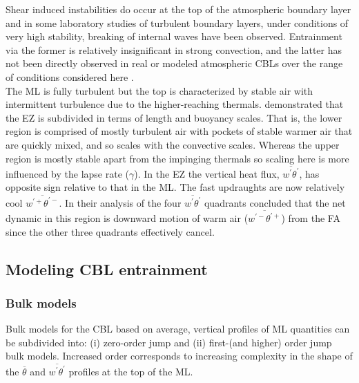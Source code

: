 Shear induced instabilities do occur at the top of the atmospheric boundary layer and in some laboratory studies of turbulent boundary layers, under conditions of very high stability, breaking of internal waves have been observed.  Entrainment via the former is relatively insignificant in strong convection, and the latter has not been directly observed in real or modeled atmospheric CBLs over the range of conditions considered here \citep{Traum11, SullMoengStev}.\\

The ML is fully turbulent but the top is characterized by stable air with intermittent turbulence due to the higher-reaching thermals. \cite{GarciaMellado} demonstrated that the EZ is subdivided in terms of length and buoyancy scales.  That is, the lower region is comprised of mostly turbulent air with pockets of stable warmer air that are quickly mixed, and so scales with the convective scales. Whereas the upper region is mostly stable apart from the impinging thermals so scaling here is more influenced by the lapse rate ($\gamma$).  In the EZ the vertical heat flux, $\overline{w^{'}\theta^{'}}$, has opposite sign relative to that in the ML.  The fast updraughts are now relatively cool $\overline{w^{'+}\theta^{'-}}$.  In their analysis of the four $\overline{w^{'}\theta^{'}}$ quadrants \cite{SullMoengStev} concluded that the net dynamic in this region is downward motion of warm air ($\overline{w^{'-}\theta^{'+}}$) from the FA since the other three quadrants effectively cancel.\\

\subsection{Modeling CBL entrainment}

\subsubsection{Bulk models}
\label{subsubsec:bulkmod}

Bulk  models for the CBL based on average, vertical profiles of ML quantities can be subdivided into: (i) zero-order jump and (ii) first-(and higher) order jump bulk models.  Increased order corresponds to increasing complexity in the shape of the  $\overline{\theta}$ and $\overline{w^{'}\theta^{'}}$ profiles at the top of the ML.\\
 
